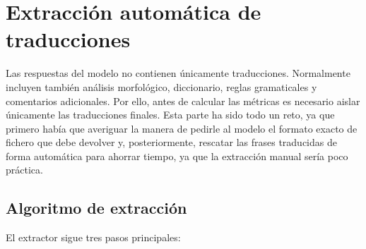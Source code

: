 \section{Extracción automática de traducciones}
\label{sec:extractor-traducciones}

Las respuestas del modelo no contienen únicamente traducciones. Normalmente incluyen también análisis morfológico, diccionario, reglas gramaticales y comentarios adicionales. Por ello, antes de calcular las métricas es necesario aislar únicamente las traducciones finales. Esta parte ha sido todo un reto, ya que primero había que averiguar la manera de pedirle al modelo el formato exacto de fichero que debe devolver y, posteriormente, rescatar las frases traducidas de forma automática para ahorrar tiempo, ya que la extracción manual sería poco práctica.

\subsection{Algoritmo de extracción}
\label{subsec:algoritmo-extractor}

El extractor sigue tres pasos principales:

